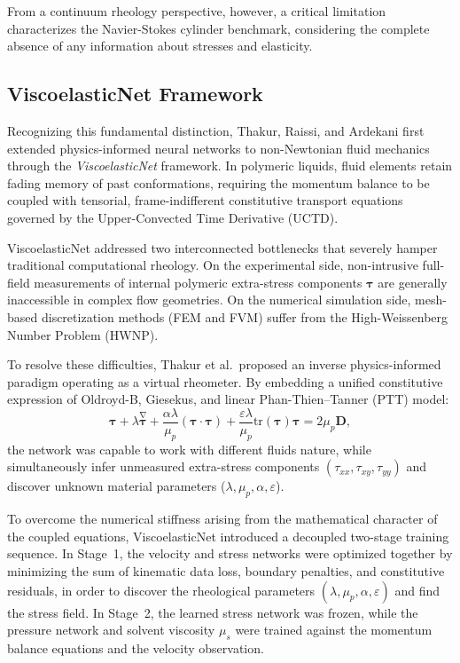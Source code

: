 From a continuum rheology perspective, however, a critical limitation characterizes
the Navier-Stokes cylinder benchmark, considering the complete absence of any information about stresses and elasticity.

\subsection{ViscoelasticNet Framework}
\label{subsec:viscoelasticnet_benchmark}

Recognizing this fundamental distinction, Thakur, Raissi, and Ardekani
\cite{thakur2024viscoelasticnet} first extended physics-informed
neural networks to non-Newtonian fluid mechanics through the \textit{ViscoelasticNet}
framework. In polymeric liquids, fluid elements retain fading memory of past
conformations, requiring the momentum balance to be coupled with tensorial,
frame-indifferent constitutive transport equations governed by the Upper-Convected
Time Derivative (UCTD).

ViscoelasticNet addressed two interconnected bottlenecks that severely hamper
traditional computational rheology. On the experimental side, non-intrusive full-field
measurements of internal polymeric extra-stress components $\boldsymbol{\tau}$ are
generally inaccessible in complex flow geometries. On the numerical simulation side,
mesh-based discretization methods (FEM and FVM) suffer from the High-Weissenberg
Number Problem (HWNP).

To resolve these difficulties, Thakur et al.\ proposed an inverse physics-informed
paradigm operating as a virtual rheometer. By embedding a unified constitutive
expression of Oldroyd-B, Giesekus, and linear Phan-Thien--Tanner (PTT) model:
\begin{equation}
    \boldsymbol{\tau} + \lambda \overset{\nabla}{\boldsymbol{\tau}} + \frac{\alpha \lambda}{\mu_p} (\boldsymbol{\tau} \cdot \boldsymbol{\tau}) + \frac{\varepsilon \lambda}{\mu_p} \text{tr}(\boldsymbol{\tau}) \boldsymbol{\tau} = 2\mu_p \boldsymbol{D} ,
    \label{eq:unified_constitutive_thakur}
\end{equation}
the network was capable to work with different fluids nature, while simultaneously infer
unmeasured extra-stress components $(\tau_{xx}, \tau_{xy}, \tau_{yy})$ and discover
unknown material parameters ($\lambda, \mu_p, \alpha, \varepsilon$).

To overcome the numerical stiffness arising from the mathematical
character of the coupled equations, ViscoelasticNet introduced a
decoupled two-stage training sequence. In Stage~1, the velocity and stress networks
were optimized together by minimizing the sum of kinematic data loss, boundary
penalties, and constitutive residuals, in order to discover the rheological
parameters $(\lambda, \mu_p, \alpha, \varepsilon)$ and find the stress field.
In Stage~2, the learned stress network was frozen,
while the pressure network and solvent viscosity $\mu_s$ were trained
against the momentum balance equations and the velocity observation.

